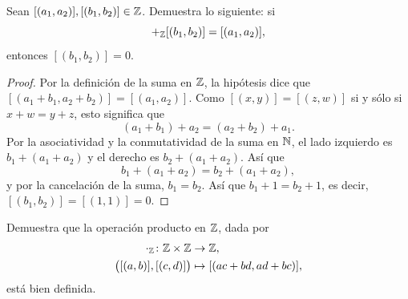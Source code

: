 \documentclass[12pt,a4paper]{article}
\begin{document}
    \thispagestyle{empty}
    

    \begin{problema}
        Sean $[(a_1,a_2)],[(b_1,b_2)]\in\mathbb{Z}$. Demuestra lo siguiente: si
        \begin{equation*}
            [(a_1,a_2)]+_{\Z}[(b_1,b_2)]=[(a_1,a_2)],
        \end{equation*}
        entonces $[(b_1,b_2)]=0$.
    \end{problema}

    \begin{proof}
        Por la definición de la suma en $\mathbb{Z}$, la hipótesis dice que $[(a_1+b_1,a_2+b_2)]=[(a_1,a_2)]$. Como
        $[(x,y)]=[(z,w)]$ si y sólo si $x+w=y+z$, esto significa que
        \begin{equation*}
            (a_1+b_1)+a_2=(a_2+b_2)+a_1.
        \end{equation*}
        Por la asociatividad y la conmutatividad de la suma en $\mathbb{N}$, el lado izquierdo es $b_1+(a_1+a_2)$ y el
        derecho es $b_2+(a_1+a_2)$. Así que
        \begin{equation*}
            b_1+(a_1+a_2)=b_2+(a_1+a_2),
        \end{equation*}
        y por la cancelación de la suma, $b_1=b_2$. Así que $b_1+1=b_2+1$, es decir, $[(b_1,b_2)]=[(1,1)]=0$.
    \end{proof}

    \begin{problema}
        Demuestra que la operación producto en $\mathbb{Z}$, dada por
        \begin{align*}
            \cdot_{\mathbb{Z}}\colon\mathbb{Z}\times\mathbb{Z}&\to\mathbb{Z},\\
            \big([(a,b)],[(c,d)]\big)&\mapsto[(ac+bd,ad+bc)],
        \end{align*}
        está bien definida.
    \end{problema}
\end{document}
